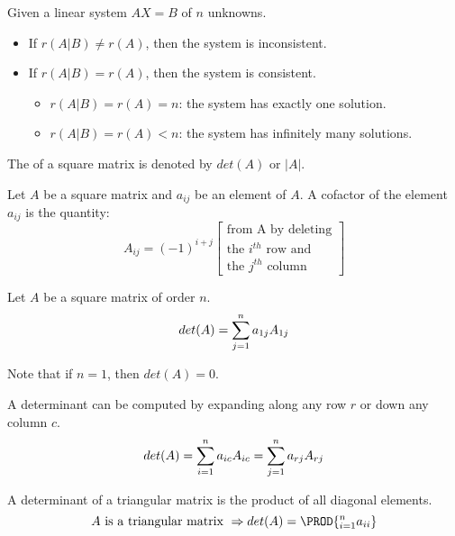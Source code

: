     \par Given a linear system $AX = B$ of $n$ unknowns.
    \begin{itemize}
      \item If $r(A|B) \neq r(A)$, then the system is inconsistent.
      \item If $r(A|B) = r(A)$, then the system is consistent.
        \begin{itemize}
          \item $r(A|B) = r(A) = n$: the system has exactly one
            solution.
          \item $r(A|B) = r(A) < n$: the system has infinitely
            many solutions.
        \end{itemize}
    \end{itemize}

    \par The  of a square matrix is denoted by $det(A)$ or $|A|$.
    \par Let $A$ be a square matrix and $a_{ij}$ be an element of $A$. A cofactor of
    the element $a_{ij}$ is the quantity:
    \[
      A_{ij} = (-1)^{i + j}
      \begin{bmatrix}
        \mbox{from A by deleting} \\
        \mbox{the $i^{th}$ row and} \\
        \mbox{the $j^{th}$ column}
      \end{bmatrix}
    \]

    \par Let $A$ be a square matrix of order $n$.
    \[
      det(A) = \sum\limits _{j = 1}^{n} a_{1j} A_{1j}
    \]
    \par Note that if $n = 1$, then $det(A) = 0$.

      \par A determinant can be computed by expanding along any row $r$ or
      down any column $c$.
      \[
        det(A) = \sum\limits _{i = 1}^{n} a_{ic} A_{ic}
               = \sum\limits _{j = 1}^{n} a_{rj} A_{rj}
      \]

      \par A determinant of a triangular matrix is the product of all diagonal
      elements.
      \[
        A \text{ is a triangular matrix }
          \Rightarrow det(A) = \PROD{_{i = 1}^{n} a_{ii}}
      \]

